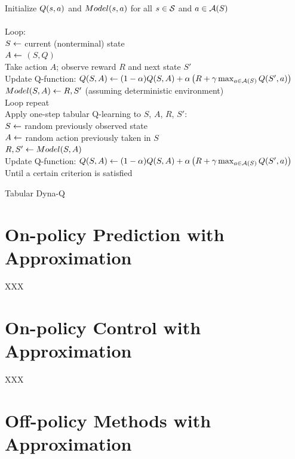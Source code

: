 \begin{table}
\beginalg
Initialize $Q(s,a)$ and $Model(s,a)$ for all $s\in\mathcal{S}$ and $a\in\mathcal{A}(S)$\\
\\
Loop:\\
\> $S \leftarrow$ current (nonterminal) state\\
\> $A \leftarrow$ \epsgreedy$(S,Q)$ \\
\> Take action $A$; observe reward $R$ and next state $S'$\\
\> Update Q-function: $Q(S,A) \leftarrow (1-\alpha) Q(S,A) + \alpha \left( R + \gamma \max_{a\in\mathcal{A}(S)}Q(S',a)\right)$\\
\> $Model(S,A) \leftarrow R, S'$ (assuming deterministic environment)\\
\> Loop repeat\\
\> Apply one-step tabular Q-learning to $S$, $A$, $R$, $S'$:\\
\> \> $S \leftarrow$ random previously observed state\\
\> \> $A \leftarrow$ random action previously taken in $S$\\
\> \> $R, S' \leftarrow Model(S,A)$\\
\> \> Update Q-function: $Q(S,A) \leftarrow (1-\alpha) Q(S,A) + \alpha \left( R + \gamma \max_{a\in\mathcal{A}(S)}Q(S',a) \right)$\\
Until a certain criterion is satisfied
\endalg
\caption{Tabular Dyna-Q}
\label{tab:alg:tabular-dyna-q}
\end{table}


\section{On-policy Prediction with Approximation}

XXX

\section{On-policy Control with Approximation}

XXX

\section{Off-policy Methods with Approximation}

